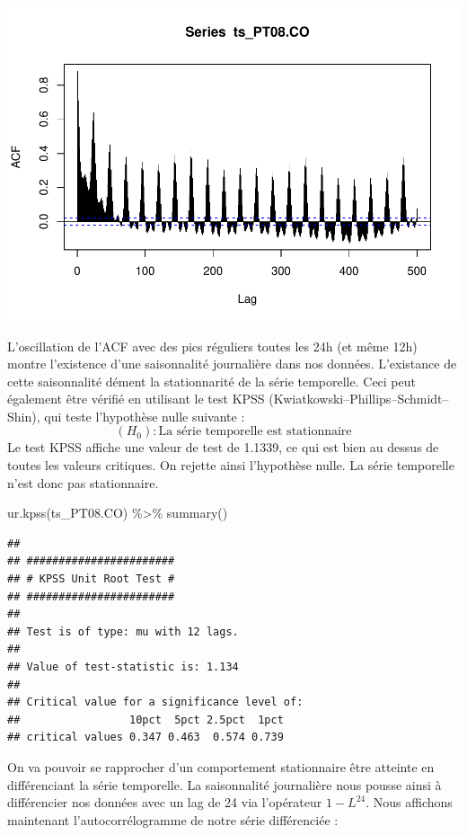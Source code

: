 \documentclass[
]{article}
\newenvironment{Shaded}{\begin{snugshade}}{\end{snugshade}}
\newcommand{\FunctionTok}[1]{\textcolor[rgb]{0.00,0.00,0.00}{#1}}
\newcommand{\NormalTok}[1]{#1}
\newcommand{\SpecialCharTok}[1]{\textcolor[rgb]{0.00,0.00,0.00}{#1}}
\begin{document}
\includegraphics{STA202_report_files/figure-latex/unnamed-chunk-9-1.pdf}

L'oscillation de l'ACF avec des pics réguliers toutes les 24h (et même
12h) montre l'existence d'une saisonnalité journalière dans nos données.
L'existance de cette saisonnalité dément la stationnarité de la série
temporelle. Ceci peut également être vérifié en utilisant le test KPSS
(Kwiatkowski--Phillips--Schmidt--Shin), qui teste l'hypothèse nulle
suivante : \[(H_0): \text{La série temporelle est stationnaire}\] Le
test KPSS affiche une valeur de test de 1.1339, ce qui est bien au
dessus de toutes les valeurs critiques. On rejette ainsi l'hypothèse
nulle. La série temporelle n'est donc pas stationnaire.

\begin{Shaded}
\begin{Highlighting}[]
\FunctionTok{ur.kpss}\NormalTok{(ts\_PT08.CO) }\SpecialCharTok{\%\textgreater{}\%}
  \FunctionTok{summary}\NormalTok{()}
\end{Highlighting}
\end{Shaded}

\begin{verbatim}
## 
## ####################### 
## # KPSS Unit Root Test # 
## ####################### 
## 
## Test is of type: mu with 12 lags. 
## 
## Value of test-statistic is: 1.134 
## 
## Critical value for a significance level of: 
##                 10pct  5pct 2.5pct  1pct
## critical values 0.347 0.463  0.574 0.739
\end{verbatim}

On va pouvoir se rapprocher d'un comportement stationnaire être atteinte
en différenciant la série temporelle. La saisonnalité journalière nous
pousse ainsi à différencier nos données avec un lag de 24 via
l'opérateur \(1-L^{24}\). Nous affichons maintenant l'autocorrélogramme
de notre série différenciée :
\end{document}

